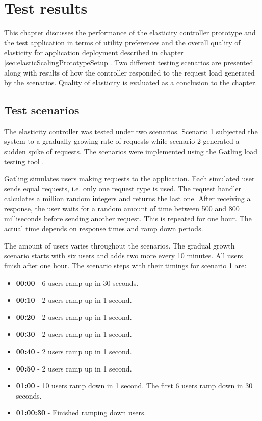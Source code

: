 \documentclass[english]{tktltiki2}
\theoremstyle{definition}
\theoremstyle{remark}
\begin{document}
\section{Test results}
\label{sec:results}

This chapter discusses the performance of the elasticity controller prototype
and the test application in terms of utility preferences and the overall quality
of elasticity for application deployment described in chapter
\ref{sec:elasticScalingPrototypeSetup}. Two different testing scenarios are
presented along with results of how the controller responded to the request load
generated by the scenarios. Quality of elasticity is evaluated as a conclusion to the chapter.

\subsection{Test scenarios} \label{sec:testScenarios} 

The elasticity controller was tested under two scenarios. Scenario 1 subjected
the system to a gradually growing rate of requests while scenario 2 generated a
sudden spike of requests. The scenarios were implemented using the Gatling load
testing tool \cite{gatling}.

Gatling simulates users making requests to the application. Each simulated user
sends equal requests, i.e. only one request type is used. The request handler
calculates a million random integers and returns the last one. After receiving a
response, the user waits for a random amount of time between 500 and 800
milliseconds before sending another request. This is repeated for one hour. The
actual time depends on response times and ramp down periods.

The amount of users varies throughout the scenarios. The gradual growth scenario
starts with six users and adds two more every 10 minutes. All users finish after
one hour. The scenario steps with their timings for scenario 1 are:

\begin{itemize}
	\item{\textbf{00:00} - 6 users ramp up in 30 seconds.}
	\item{\textbf{00:10} - 2 users ramp up in 1 second.}
	\item{\textbf{00:20} - 2 users ramp up in 1 second.}
	\item{\textbf{00:30} - 2 users ramp up in 1 second.}
	\item{\textbf{00:40} - 2 users ramp up in 1 second.}
	\item{\textbf{00:50} - 2 users ramp up in 1 second.}
	\item{\textbf{01:00} - 10 users ramp down in 1 second. The first 6 users ramp 
			down in 30 seconds.}	
	\item{\textbf{01:00:30} - Finished ramping down users.}
	\label{gatlingStepsScenario1}
\end{itemize}
\end{document}
